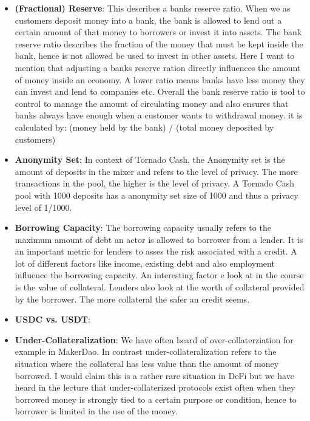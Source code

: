 \documentclass{article}
\begin{document}
\begin{itemize}
    \item \textbf{(Fractional) Reserve}: This describes a banks reserve ratio. When we as customers deposit money into a bank, the bank is allowed to lend out a certain amount of that  money to borrowers or invest it into assets. The bank reserve ratio describes the fraction of the money that must be kept inside the bank, hence is not allowed be used to invest in other assets. Here I want to mention that adjusting a banks reserve ration directly influences the amount of money inside an economy. A lower ratio means banks have less money they can invest and lend to companies etc. Overall the bank reserve ratio is tool to control to manage the amount of circulating money and also ensures that banks always have enough when a customer wants to withdrawal money. it is calculated by: (money held by the bank) / (total money deposited by customers)
    
    \item \textbf{Anonymity Set}: In context of Tornado Cash, the Anonymity set is the amount of deposits in the mixer and refers to the level of privacy. The more transactions in the pool, the higher is the level of privacy. A Tornado Cash pool with 1000 deposits has a anonymity set size of 1000 and thus a privacy level of 1/1000.
    
    \item \textbf{Borrowing Capacity}: The borrowing capacity usually refers to the maximum amount of debt an actor is allowed to borrower from a lender. It is an important metric for lenders to asses the risk associated with a credit. A lot of different factors like income, existing debt and also employment influence the borrowing capacity. An interesting factor e look at in the course is the value of collateral. Lenders also look at the worth of collateral provided by the borrower. The more collateral the safer an credit seems.

 \item \textbf{USDC vs. USDT}:

\item \textbf{Under-Collateralization}: We have often heard of over-collaterziation for example in MakerDao. In contrast under-collateralization refers to the situation where the collateral has less value than the amount of money borrowed. I would claim this is a rather rare situation in DeFi but we have heard in the lecture that under-collaterized protocols exist often when they borrowed money is strongly tied to a certain purpose or condition, hence to borrower is limited in the use of the money.



\end{itemize}
\end{document}
